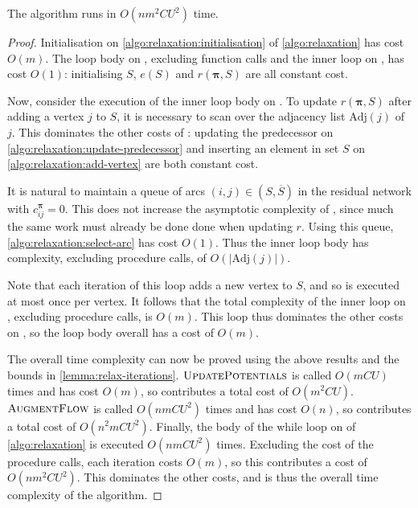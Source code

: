 \begin{thm} The algorithm runs in $O(nm^2CU^2)$ time.
\end{thm}
\begin{proof}
Initialisation on \cref{algo:relaxation:initialisation} of \cref{algo:relaxation} has cost $O(m)$. The loop body on , excluding function calls and the inner loop on , has cost $O(1)$: initialising $S$, $e(S)$ and $r(\boldsymbol{\pi},S)$ are all constant cost.

Now, consider the execution of the inner loop body on . To update $r(\boldsymbol{\pi},S)$ after adding a vertex $j$ to $S$, it is necessary to scan over the adjacency list $\mathrm{Adj}(j)$ of $j$. This dominates the other costs of : updating the predecessor on \cref{algo:relaxation:update-predecessor} and inserting an element in set $S$ on \cref{algo:relaxation:add-vertex} are both constant cost. 

It is natural to maintain a queue of arcs $(i,j) \in \left(S,\overline{S}\right)$ in the residual network with $c_{ij}^{\boldsymbol{\pi}}=0$. This does not increase the asymptotic complexity of , since much the same work must already be done done when updating $r$. Using this queue, \cref{algo:relaxation:select-arc} has cost $O(1)$. Thus the inner loop body has complexity, excluding procedure calls, of $O\left(\left|\mathrm{Adj}(j)\right|\right)$.

Note that each iteration of this loop adds a new vertex to $S$, and so is executed at most once per vertex. It follows that the total complexity of the inner loop on , excluding procedure calls, is $O(m)$. This loop thus dominates the other costs on , so the loop body overall has a cost of $O(m)$.

The overall time complexity can now be proved using the above results and the bounds in \cref{lemma:relax-iterations}. $\textproc{UpdatePotentials}$ is called $O(mCU)$ times and has cost $O(m)$, so contributes a total cost of $O(m^2CU)$. $\textproc{AugmentFlow}$ is called $O(nmCU^2)$ times and has cost $O(n)$, so contributes a total cost of $O(n^2mCU^2)$. Finally, the body of the while loop on  of \cref{algo:relaxation} is executed $O(nmCU^2)$ times. Excluding the cost of the procedure calls, each iteration costs $O(m)$, so this contributes a cost of $O(nm^2CU^2)$. This dominates the other costs, and is thus the overall time complexity of the algorithm.
\end{proof}

